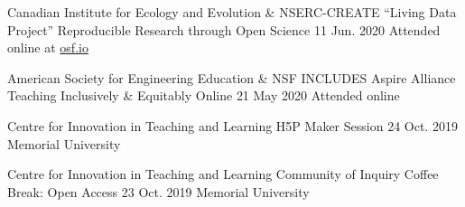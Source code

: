 \begin{cventries}
  \cventry
    {Canadian Institute for Ecology and Evolution \& NSERC-CREATE ``Living Data Project''} %
    {Reproducible Research through Open Science} %
    {11 Jun. 2020} %
    {Attended online at \href{https://osf.io/p7r5d/}{osf.io}} %
    {
    }

  \cventry
    {American Society for Engineering Education \& NSF INCLUDES Aspire Alliance} %
    {Teaching Inclusively \& Equitably Online} %
    {21 May 2020} %
    {Attended online} %
    {
    }

  \cventry
    {Centre for Innovation in Teaching and Learning} %
    {H5P Maker Session} %
    {24 Oct. 2019} %
    {Memorial University} %
    {
    }

  \cventry
    {Centre for Innovation in Teaching and Learning} %
    {Community of Inquiry Coffee Break: Open Access} %
    {23 Oct. 2019} %
    {Memorial University} %
    {
    }


\end{cventries}
